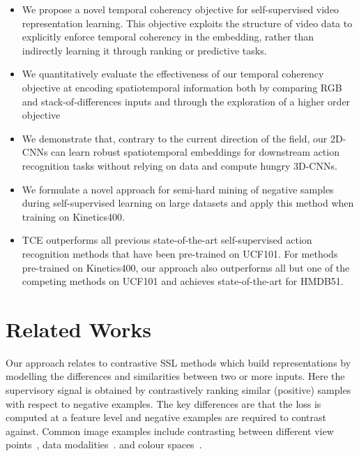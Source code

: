 \documentclass[a4paper,conference]{IEEEtran}
\begin{document}
\begin{itemize}
    \item We propose a novel temporal coherency objective for self-supervised video representation learning. This objective exploits the structure of video data to explicitly enforce temporal coherency in the embedding, rather than indirectly learning it through ranking or predictive tasks.
    \item We quantitatively evaluate the effectiveness of our temporal coherency objective at encoding spatiotemporal information both by comparing RGB and stack-of-differences inputs and through the exploration of a higher order objective
    \item We demonstrate that, contrary to the current direction of the field, our 2D-CNNs can learn robust spatiotemporal embeddings for downstream action recognition tasks without relying on data and compute hungry 3D-CNNs.
    \item We formulate a novel approach for semi-hard mining of negative samples during self-supervised learning on large datasets and apply this method when training on Kinetics400.
    \item TCE outperforms all previous state-of-the-art self-supervised action recognition methods that have been pre-trained on UCF101.
For methods pre-trained on Kinetics400, our approach also outperforms all but one of the competing methods on UCF101 and achieves state-of-the-art for HMDB51.
\end{itemize}


















 \section{Related Works} \label{sec: Related Works}


Our approach relates to contrastive SSL methods which build representations by modelling the differences and similarities between two or more inputs. Here the supervisory signal is obtained by contrastively ranking similar (positive) samples with respect to negative examples. The key differences are that the loss is computed at a feature level and negative examples are required to contrast against. Common image examples include contrasting between different view points~\cite{sermanet2018time}, data modalities~\cite{tian2019contrastive}. and colour spaces~\cite{tian2019contrastive}.
\end{document}
